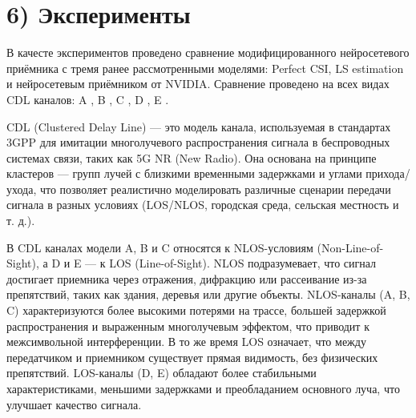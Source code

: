 \documentclass{article}
\begin{document}
\section*{6) Эксперименты}

В качесте экспериментов проведено сравнение модифицированного нейросетевого приёмника с тремя ранее рассмотренными моделями: Perfect CSI, LS estimation и нейросетевым приёмником от NVIDIA. Сравнение проведено на всех видах CDL каналов: A , B , C , D , E .  

CDL (Clustered Delay Line) — это модель канала, используемая в стандартах 3GPP для имитации многолучевого распространения сигнала в беспроводных системах связи, таких как 5G NR (New Radio). Она основана на принципе кластеров — групп лучей с близкими временными задержками и углами прихода/ухода, что позволяет реалистично моделировать различные сценарии передачи сигнала в разных условиях (LOS/NLOS, городская среда, сельская местность и т. д.).  

В CDL каналах модели A, B и C относятся к NLOS-условиям (Non-Line-of-Sight), а D и E — к LOS (Line-of-Sight). 
NLOS подразумевает, что сигнал достигает приемника через отражения, дифракцию или рассеивание из-за препятствий, таких как здания, деревья или другие объекты. 
NLOS-каналы (A, B, C) характеризуются более высокими потерями на трассе, большей задержкой распространения и выраженным многолучевым эффектом, что приводит к межсимвольной интерференции. В то же время LOS означает, что между передатчиком и приемником существует прямая видимость, без физических препятствий. LOS-каналы (D, E) обладают более стабильными характеристиками, меньшими задержками и преобладанием основного луча, что улучшает качество сигнала. 
\end{document}
